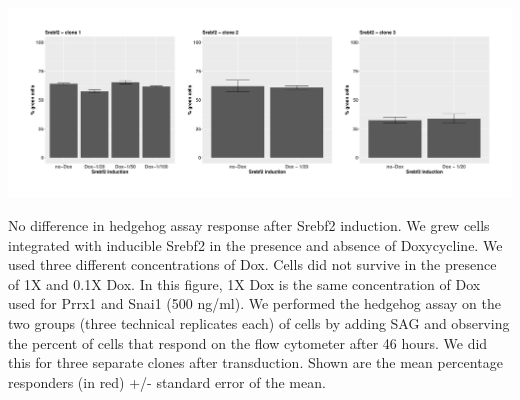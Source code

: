 \begin{suppfigure}[p]  
    \centering
    \includegraphics[width=\linewidth]{figures/hedgehog/SuppFigure19.png}
    \caption[No difference in percent green for Srebf2 induction followed by SAG treatment]{
        No difference  in hedgehog assay response after Srebf2 induction. We grew cells integrated with inducible Srebf2 in the presence and absence of Doxycycline. We used three different concentrations of Dox. Cells did not survive in the presence of 1X and 0.1X Dox. In this figure, 1X Dox is the same concentration of Dox used for Prrx1 and Snai1 (500 ng/ml). We performed the hedgehog assay on the two groups (three technical replicates each) of cells by adding SAG and observing the percent of cells that respond on the flow cytometer after 46 hours. We did this for three separate clones after transduction.  Shown are the mean percentage responders (in red) +/- standard error of the mean.  
    }
    \label{fig:hh_figureS19}
\end{suppfigure}


